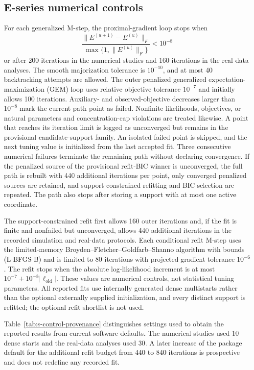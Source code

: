 \documentclass[preprint,12pt,authoryear]{elsarticle}
\begin{document}
\subsection{E-series numerical controls}

For each generalized M-step, the proximal-gradient loop stops when
\[
\frac{\lVert E^{(u+1)}-E^{(u)}\rVert_F}
{\max\{1,\lVert E^{(u)}\rVert_F\}}<10^{-8}
\]
or after 200 iterations in the numerical studies and 160 iterations in the
real-data analyses. The smooth majorization tolerance is $10^{-10}$,
and at most 40 backtracking attempts are allowed. The outer penalized
generalized expectation-maximization (GEM) loop uses relative objective
tolerance $10^{-7}$ and initially allows 100 iterations. Auxiliary- and
observed-objective decreases larger than
$10^{-8}$ mark the current path point as failed. Nonfinite likelihoods,
objectives, or natural parameters and concentration-cap violations are treated
likewise. A point that reaches its iteration limit is logged as unconverged
but remains in the provisional candidate-support family. An isolated failed
point is skipped, and the next tuning value is initialized from the last
accepted fit. Three consecutive numerical failures terminate the remaining
path without declaring convergence. If the penalized source of the provisional
refit-BIC winner is unconverged, the full path is rebuilt with 440 additional
iterations per point, only converged penalized sources are retained, and
support-constrained refitting and BIC selection are repeated. The path
also stops after storing a support with at most one active coordinate.

The support-constrained refit first allows 160 outer iterations and, if the
fit is finite and nonfailed but unconverged, allows 440 additional iterations
in the recorded simulation and real-data protocols. Each conditional refit M-step uses the
limited-memory Broyden--Fletcher--Goldfarb--Shanno algorithm with bounds
(L-BFGS-B) \citep{byrd1995lbfgsb} and is limited to 80 iterations with
projected-gradient tolerance $10^{-6}$. The refit stops when
the absolute log-likelihood increment is at most
$10^{-7}+10^{-8}|\ell_{\mathrm{old}}|$. These values are numerical controls,
not statistical tuning parameters.
All reported fits use internally generated dense multistarts rather than the
optional externally supplied initialization, and every distinct support is
refitted; the optional refit shortlist is not used.

Table~\ref{tab:s-control-provenance} distinguishes settings used to obtain the
reported results from current software defaults. The numerical studies used
10 dense starts and the real-data analyses used 30. A later increase of the
package default for the additional refit budget from 440 to 840 iterations is
prospective and does not redefine any recorded fit.
\end{document}
